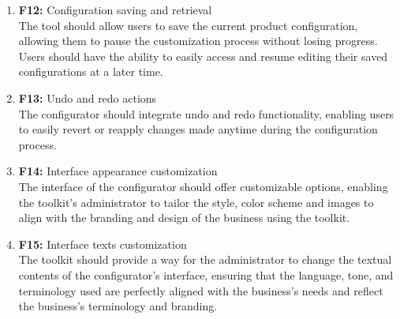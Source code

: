 \begin{enumerate}
\item \textbf{F12:} \label{itm:F12} Configuration saving and retrieval
\vspace{2pt}
\\The tool should allow users to save the current product configuration, allowing them to pause the customization process without losing progress. Users should have the ability to easily access and resume editing their saved configurations at a later time.
\vspace{4pt}

\item \textbf{F13:} \label{itm:F13} Undo and redo actions
\vspace{2pt}
\\The configurator should integrate undo and redo functionality, enabling users to easily revert or reapply changes made anytime during the configuration process.
\vspace{4pt}

\item \textbf{F14:} \label{itm:F14} Interface appearance customization
\vspace{2pt}
\\The interface of the configurator should offer customizable options, enabling the toolkit's administrator to tailor the style, color scheme and images to align with the branding and design of the business using the toolkit.
\vspace{4pt}

\item \textbf{F15:} \label{itm:F15} Interface texts customization
\vspace{2pt}
\\The toolkit should provide a way for the administrator to change the textual contents of the configurator's interface, ensuring that the language, tone, and terminology used are perfectly aligned with the business's needs and reflect the business's terminology and branding.
\vspace{4pt}


\end{enumerate}
